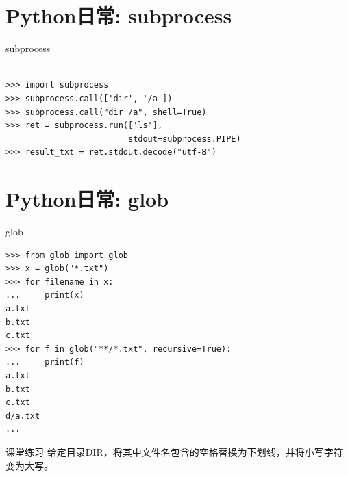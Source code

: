 \documentclass{beamer}
\begin{document}
\section{Python日常: subprocess}
\begin{frame}[t,fragile]{subprocess}
\begin{verbatim}

>>> import subprocess
>>> subprocess.call(['dir', '/a'])
>>> subprocess.call("dir /a", shell=True)
>>> ret = subprocess.run(['ls'], 
                         stdout=subprocess.PIPE)
>>> result_txt = ret.stdout.decode("utf-8")
\end{verbatim}
	
\end{frame}

\section{Python日常: glob}
\begin{frame}[t,fragile]{glob}

\begin{verbatim}
>>> from glob import glob
>>> x = glob("*.txt")
>>> for filename in x:
...     print(x)
a.txt
b.txt
c.txt
>>> for f in glob("**/*.txt", recursive=True):
...     print(f)
a.txt
b.txt
c.txt
d/a.txt
...
\end{verbatim}
	
\end{frame}

\begin{frame}[t]{课堂练习}
给定目录DIR，将其中文件名包含的空格替换为下划线，并将小写字符变为大写。	
\end{frame}
\end{document}
